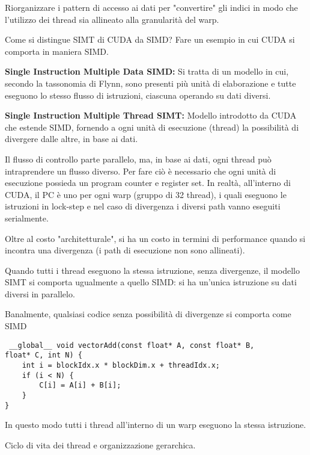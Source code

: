 \begin{questions}
\begin{solution}
        Riorganizzare i pattern di accesso ai dati per "convertire" gli indici in modo che l'utilizzo dei thread sia allineato alla granularità del warp.
    \end{solution}
    
    \question Come si distingue SIMT di CUDA da SIMD? Fare un esempio in cui CUDA si comporta in maniera SIMD.
    
    \begin{solution}
        \textbf{Single Instruction Multiple Data SIMD:} Si tratta di un modello in cui, secondo la tassonomia di Flynn, sono presenti più unità di elaborazione e tutte eseguono lo stesso flusso di istruzioni, ciascuna operando su dati diversi.  
        
        \textbf{Single Instruction Multiple Thread SIMT:} Modello introdotto da CUDA che estende SIMD, fornendo a ogni unità di esecuzione (thread) la possibilità di divergere dalle altre, in base ai dati. 
        
        Il flusso di controllo parte parallelo, ma, in base ai dati, ogni thread può intraprendere un flusso diverso. Per fare ciò è necessario che ogni unità di esecuzione possieda un program counter e register set. In realtà, all'interno di CUDA, il PC è uno per ogni warp (gruppo di 32 thread), i quali eseguono le istruzioni in lock-step e nel caso di divergenza i diversi path vanno eseguiti serialmente.
        
        Oltre al costo "architetturale", si ha un costo in termini di performance quando si incontra una divergenza (i path di esecuzione non sono allineati).
        
        Quando tutti i thread eseguono la stessa istruzione, senza divergenze, il modello SIMT si comporta ugualmente a quello SIMD: si ha un'unica istruzione su dati diversi in parallelo.
        
        Banalmente, qualsiasi codice senza possibilità di divergenze si comporta come SIMD
        \begin{verbatim}
 __global__ void vectorAdd(const float* A, const float* B, 
float* C, int N) {
    int i = blockIdx.x * blockDim.x + threadIdx.x;
    if (i < N) {
        C[i] = A[i] + B[i];
    }
}
        \end{verbatim}
        In questo modo tutti i thread all'interno di un warp eseguono la stessa istruzione.
    \end{solution}
    
    \question Ciclo di vita dei thread e organizzazione gerarchica.
    

\end{questions}
